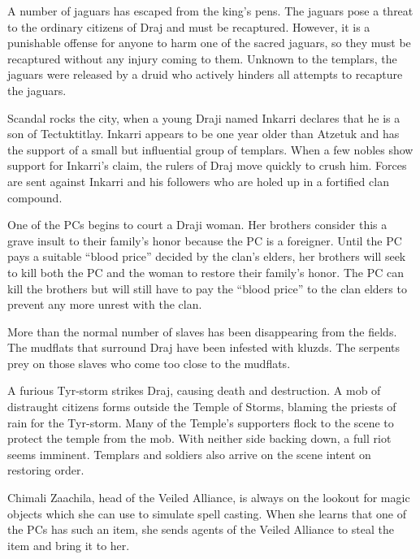 {
	\item A number of jaguars has escaped from the king's pens. The jaguars pose a threat to the ordinary citizens of Draj and must be recaptured. However, it is a punishable offense for anyone to harm one of the sacred jaguars, so they must be recaptured without any injury coming to them. Unknown to the templars, the jaguars were released by a druid who actively hinders all attempts to recapture the jaguars.
	\item Scandal rocks the city, when a young Draji named Inkarri declares that he is a son of Tectuktitlay. Inkarri appears to be one year older than Atzetuk and has the support of a small but influential group of templars. When a few nobles show support for Inkarri's claim, the rulers of Draj move quickly to crush him. Forces are sent against Inkarri and his followers who are holed up in a fortified clan compound.
	\item One of the PCs begins to court a Draji woman. Her brothers consider this a grave insult to their family's honor because the PC is a foreigner. Until the PC pays a suitable ``blood price'' decided by the clan's elders, her brothers will seek to kill both the PC and the woman to restore their family's honor. The PC can kill the brothers but will still have to pay the ``blood price'' to the clan elders to prevent any more unrest with the clan.
	\item More than the normal number of slaves has been disappearing from the fields. The mudflats that surround Draj have been infested with kluzds. The serpents prey on those slaves who come too close to the mudflats.
	\item A furious Tyr-storm strikes Draj, causing death and destruction. A mob of distraught citizens forms outside the Temple of Storms, blaming the priests of rain for the Tyr-storm. Many of the Temple's supporters flock to the scene to protect the temple from the mob. With neither side backing down, a full riot seems imminent. Templars and soldiers also arrive on the scene intent on restoring order.
	\item Chimali Zaachila, head of the Veiled Alliance, is always on the lookout for magic objects which she can use to simulate spell casting. When she learns that one of the PCs has such an item, she sends agents of the Veiled Alliance to steal the item and bring it to her. 
}